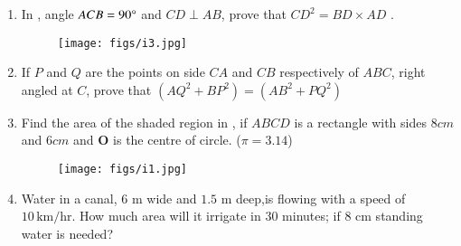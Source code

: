\documentclass[12pt,-letter paper]{article}
\let\vec\mathbf{}
\let\vec\mathbf{}
\let\vec\mathbf{}
\providecommand{\brak}[1]{\ensuremath{\left(#1\right)}}\graphicspath{{/storage/self/primary/Download/latexnew/fig}}
\begin{document}
\begin{enumerate}
\begin{figure}[H]
                \end{figure}
\item In , angle $ACB = 90\degree$  and $CD \perp AB$, prove that $CD ^ 2 = BD\times AD$ .
\begin{figure}[H]                                                            \centering
                        \texttt{[image: figs/i3.jpg]}
			\caption{}
			\label{fig:figure3}
                \end{figure}
\item If $P$ and $Q$ are the points on side $CA$ and $CB$ respectively of  $ABC$, right angled at $C$, prove that $\brak{AQ^2 + BP^2} = \brak{AB^2 +PQ^2}$
\item Find the area of the shaded region in , if $ABCD$ is a rectangle with sides $8 cm$ and $6 cm$ and $\vec{O}$ is the centre of circle. ($\pi = 3.14$)
	\begin{figure}[H]                                     \centering
	\texttt{[image: figs/i1.jpg]}
		\caption{}
		\label{fig:figure4}

                \end{figure}

\item Water in a canal, $6$ m wide and $1.5$ m deep,is flowing with a speed of $10 \,\text{km/hr}$. How much area will it irrigate in $30$ minutes; if $8$ cm standing water is needed?



\end{enumerate}
\end{document}
